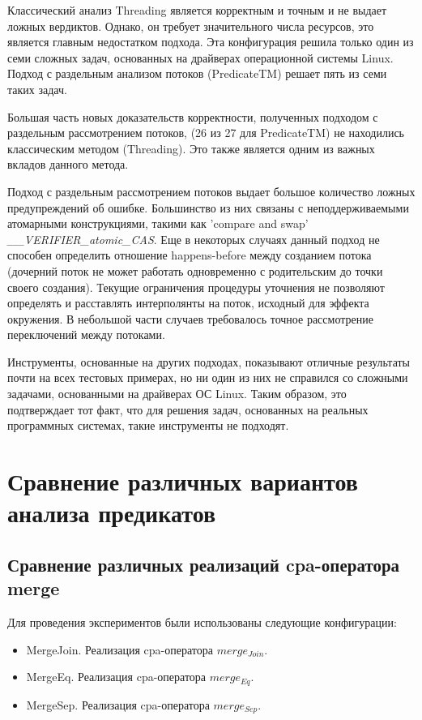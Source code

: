 Классический анализ Threading является корректным и точным и не выдает ложных вердиктов.
Однако, он требует значительного числа ресурсов, это является главным недостатком подхода.
Эта конфигурация решила только один из семи сложных задач, основанных на драйверах операционной системы Linux.
Подход с раздельным анализом потоков (PredicateTM) решает пять из семи таких задач. 

Большая часть новых доказательств корректности, полученных подходом с раздельным рассмотрением потоков, (26 из 27 для PredicateTM) не находились классическим методом (Threading). Это также является одним из важных вкладов данного метода.

Подход с раздельным рассмотрением потоков выдает большое количество ложных предупреждений об ошибке. 
Большинство из них связаны с неподдерживаемыми атомарными конструкциями, такими как 'compare and swap' {\em \_\_VERIFIER\_atomic\_CAS}.
Еще в некоторых случаях данный подход не способен определить отношение happens-before между созданием потока (дочерний поток не может работать одновременно с родительским до точки своего создания).
Текущие ограничения процедуры уточнения не позволяют определять и расставлять интерполянты на поток, исходный для эффекта окружения.
В небольшой части случаев требовалось точное рассмотрение переключений между потоками.

Инструменты, основанные на других подходах, показывают отличные результаты почти на всех тестовых примерах, но ни один из них не справился со сложными задачами, основанными на драйверах ОС Linux. 
Таким образом, это подтверждает тот факт, что для решения задач, основанных на реальных программных системах, такие инструменты не подходят. 

\section{Сравнение различных вариантов анализа предикатов}

\subsection{Сравнение различных реализаций cpa-оператора merge}

Для проведения экспериментов были использованы следующие конфигурации:

\begin{itemize}
\item MergeJoin. Реализация cpa-оператора $merge_{Join}$.
\item MergeEq. Реализация cpa-оператора $merge_{Eq}$.
\item MergeSep. Реализация cpa-оператора $merge_{Sep}$.
\end{itemize}

